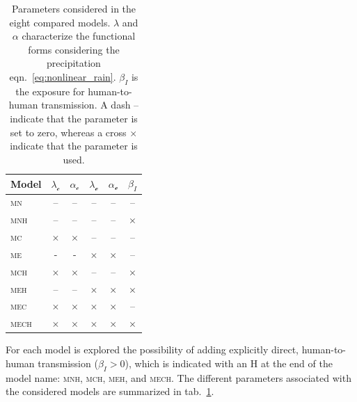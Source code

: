 \begin{table}[h!]
\centering
\begin{tabular}{lccccc}
\toprule
     Model       & $\lambda_{\mathcal{c}}$ & $\alpha_\mathcal{c}$ & $\lambda_{\mathcal{e}}$ & $\alpha_\mathcal{e}$ & $\beta_I$   \\
    \hline
    \textsc{mn} &       --    &    --   &       --      &       --      &  -- \\
    \textsc{mnh} &     --      &   --    &    --         &        --     &   $\times$ \\
    \textsc{mc} &      $\times$  &  $\times$  &     --        &       --      &  -- \\
    \textsc{me} &         -  &   -    &      $\times$    &   $\times$        & --  \\
    \textsc{mch}&      $\times$  &  $\times$  &      --       &     --        &$\times$ \\
    \textsc{meh}&        --   &  --     &      $\times$    &   $\times$        &$\times$ \\
    \textsc{mec}&      $\times$ &  $\times$  &      $\times$    &    $\times$      & --\\
    \textsc{mech}&      $\times$ &  $\times$  &      $\times$    &    $\times$       &   $\times$ \\
\bottomrule
\end{tabular}
\caption[Parameters considered in the eight compared models.]{Parameters considered in the eight compared models.  $\lambda$ and $\alpha$ characterize the functional forms considering the precipitation eqn.~\eqref{eq:nonlinear_rain}. $\beta_I$ is the exposure for human-to-human transmission. A dash -- indicate that the parameter is set to zero, whereas a cross $\times$  indicate that the parameter is used.}
\label{tab:models}
\end{table}

 For each model is explored the possibility of adding explicitly direct, human-to-human transmission ($\beta_{I} > 0$), which is indicated with an \textsc{H} at the end of the model name: \textsc{mnh}, \textsc{mch}, \textsc{meh}, and \textsc{mech}. The different parameters associated with the considered models are summarized in tab.~\ref{tab:models}.

